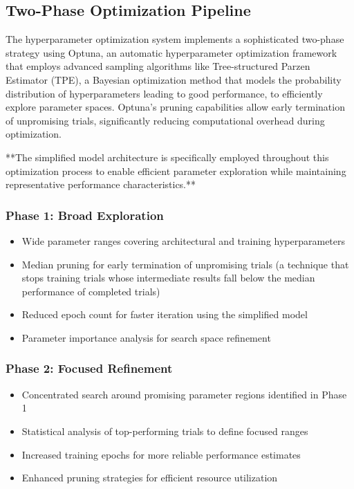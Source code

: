 \documentclass[a4paper]{usiinfbachelorproject}
\begin{document}
\subsection{Two-Phase Optimization Pipeline}

The hyperparameter optimization system implements a sophisticated two-phase strategy using Optuna, an automatic hyperparameter optimization framework that employs advanced sampling algorithms like Tree-structured Parzen Estimator (TPE), a Bayesian optimization method that models the probability distribution of hyperparameters leading to good performance, to efficiently explore parameter spaces. Optuna's pruning capabilities allow early termination of unpromising trials, significantly reducing computational overhead during optimization.

**The simplified model architecture is specifically employed throughout this optimization process to enable efficient parameter exploration while maintaining representative performance characteristics.**

\subsubsection{Phase 1: Broad Exploration}
\begin{itemize}
    \item Wide parameter ranges covering architectural and training hyperparameters
    \item Median pruning for early termination of unpromising trials (a technique that stops training trials whose intermediate results fall below the median performance of completed trials)
    \item Reduced epoch count for faster iteration using the simplified model
    \item Parameter importance analysis for search space refinement
\end{itemize}

\subsubsection{Phase 2: Focused Refinement}
\begin{itemize}
    \item Concentrated search around promising parameter regions identified in Phase 1
    \item Statistical analysis of top-performing trials to define focused ranges
    \item Increased training epochs for more reliable performance estimates
    \item Enhanced pruning strategies for efficient resource utilization
\end{itemize}
\end{document}

